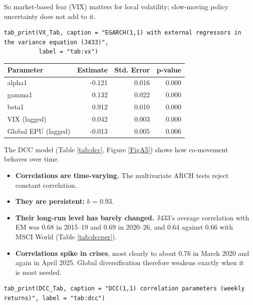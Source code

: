 \documentclass[11pt,preprint]{elsarticle}
\let\origtable\table
\let\endorigtable\endtable
\renewenvironment{table}[1][2] {
    \expandafter\origtable\expandafter[H]
} {
    \endorigtable
}
\numberwithin{equation}{section}
\numberwithin{figure}{section}
\numberwithin{table}{section}
\def\tightlist{} %
\begin{document}
So market-based fear (VIX) matters for local volatility; slow-moving
policy uncertainty does not add to it.

\begin{verbatim}
tab_print(VX_Tab, caption = "EGARCH(1,1) with external regressors in the variance equation (J433)",
          label = "tab:vx")
\end{verbatim}

\begin{table}[!htbp]
\centering
\caption{EGARCH(1,1) with external regressors in the variance equation (J433)} 
\label{tab:vx}
\begingroup\footnotesize
\begin{tabular}{lrrr}
  \hline
Parameter & Estimate & Std. Error & p-value \\ 
  \hline
alpha1 & -0.121 & 0.016 & 0.000 \\ 
  gamma1 & 0.132 & 0.022 & 0.000 \\ 
  beta1 & 0.912 & 0.010 & 0.000 \\ 
  VIX (lagged) & 0.042 & 0.003 & 0.000 \\ 
  Global EPU (lagged) & -0.013 & 0.005 & 0.006 \\ 
   \hline
\end{tabular}
\endgroup
\end{table}

The DCC model (Table \ref{tab:dcc}, Figure \ref{FigA5}) shows how
co-movement behaves over time.

\begin{itemize}
\tightlist
\item
  \textbf{Correlations are time-varying.} The multivariate ARCH tests
  reject constant correlation.
\item
  \textbf{They are persistent:} \(b\) = 0.93.
\item
  \textbf{Their long-run level has barely changed.} J433's average
  correlation with EM was 0.68 in 2015--19 and 0.69 in 2020--26, and
  0.64 against 0.66 with MSCI World (Table \ref{tab:dccper}).
\item
  \textbf{Correlations spike in crises}, most clearly to about 0.76 in
  March 2020 and again in April 2025. Global diversification therefore
  weakens exactly when it is most needed.
\end{itemize}

\begin{verbatim}
tab_print(DCC_Tab, caption = "DCC(1,1) correlation parameters (weekly returns)", label = "tab:dcc")
\end{verbatim}
\end{document}
